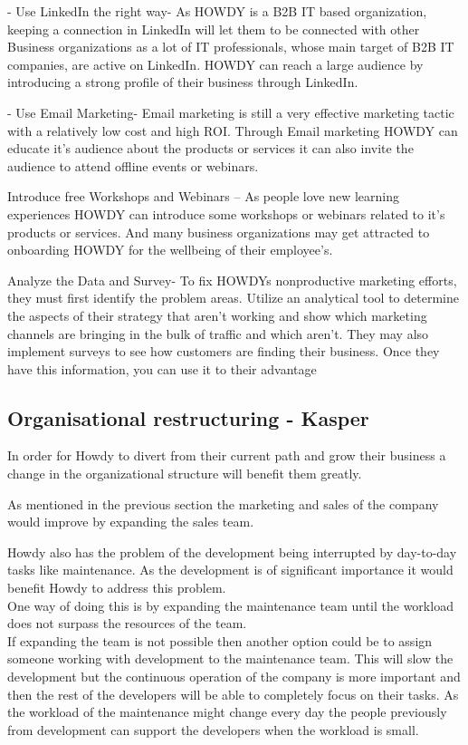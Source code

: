 - Use LinkedIn the right way- As HOWDY is a B2B IT based organization, keeping a connection in LinkedIn will let them to be connected with other Business organizations as a lot of IT professionals, whose main target of B2B IT companies, are active on LinkedIn. HOWDY can reach a large audience by introducing a strong profile of their business through LinkedIn.

- Use Email Marketing- Email marketing is still a very effective marketing tactic with a relatively low cost and high ROI. Through Email marketing HOWDY can educate it’s audience about the products or services it can also invite the audience to attend offline events or webinars.

Introduce free Workshops and Webinars – As people love new learning experiences HOWDY can introduce some workshops or webinars related to it’s products or services. And many business organizations may get attracted to onboarding HOWDY for the wellbeing of their employee’s.

Analyze the Data and Survey- To fix HOWDYs nonproductive marketing efforts, they must first identify the problem areas. Utilize an analytical tool to determine the aspects of their strategy that aren’t working and show which marketing channels are bringing in the bulk of traffic and which aren’t. They may also implement surveys to see how customers are finding their business. Once they have this information, you can use it to their advantage
 
\subsection{Organisational restructuring - Kasper}
In order for Howdy to divert from their current path and grow their business a change in the organizational structure will benefit them greatly.

\noindent As mentioned in the previous section the marketing and sales of the company would improve by expanding the sales team.

\noindent Howdy also has the problem of the development being interrupted by day-to-day tasks like maintenance. As the development is of significant importance it would benefit Howdy to address this problem.\\
\noindent One way of doing this is by expanding the maintenance team until the workload does not surpass the resources of the team.\\
\noindent If expanding the team is not possible then another option could be to assign someone working with development to the maintenance team. This will slow the development but the continuous operation of the company is more important and then the rest of the developers will be able to completely focus on their tasks. As the workload of the maintenance might change every day the people previously from development can support the developers when the workload is small.

